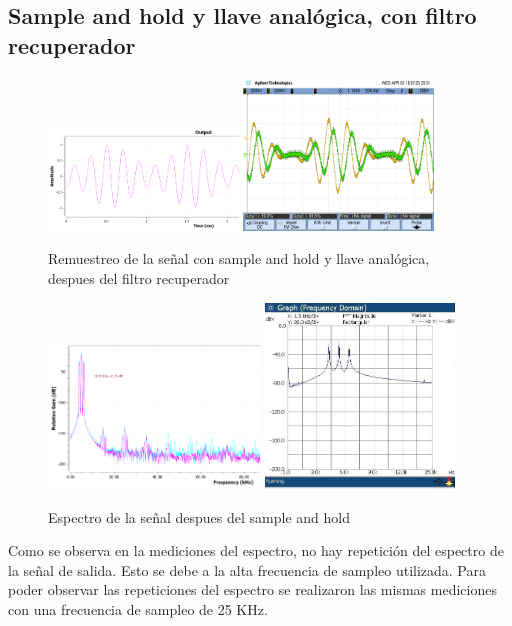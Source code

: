 \documentclass[../../ASSD_TP1_G7.tex]{subfiles}
\begin{document}
\subsection*{Sample and hold y llave analógica, con filtro recuperador}
\begin{figure}[H]
\centering
{}
{\includegraphics[width=0.45\textwidth]{figures/simlyh_pto_7_3.png}}
{\includegraphics[width=0.45\textwidth]{figures/lyh_pto_7_3.png}}
\caption{Remuestreo de la se\~nal con sample and hold y llave analógica, despues del filtro recuperador}
\end{figure}

\begin{figure}[H]
\centering
{}
{\includegraphics[width=0.5\textwidth]{figures/llsyhsimesp.PNG}}
{\includegraphics[width=0.45\textwidth]{figures/syh_llave.jpeg}}
\caption{Espectro de la se\~nal despues del sample and hold}
\end{figure}
Como se observa en la mediciones del espectro, no hay repetición del espectro de la se\~nal de salida. Esto se debe a la alta frecuencia de sampleo utilizada. Para poder observar las repeticiones del espectro se realizaron las mismas mediciones con una frecuencia de sampleo de 25 KHz.
\end{document}
